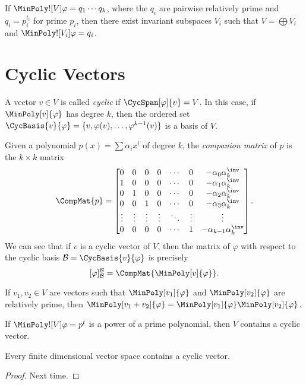\documentclass{memoir}
\begin{document}
\begin{cor}
If $\MinPoly![V]{\varphi} = q_1 \cdots q_k$, where the $q_i$ are pairwise relatively prime and $q_i = p_i^{t_i}$ for prime $p_i$, then there exist invariant subspaces $V_i$ such that $V = \bigoplus V_i$ and $\MinPoly![V_i]{\varphi} = q_i$.
\end{cor}

\section{Cyclic Vectors}

\begin{dfn}
A vector $v \in V$ is called \emph{cyclic} if $\CycSpan[\varphi]{v} = V$. In this case, if $\MinPoly[v]{\varphi}$ has degree $k$, then the ordered set $\CycBasis{v}{\varphi} = \{v,\varphi(v),\ldots,\varphi^{k-1}(v)\}$ is a basis of $V$.
\end{dfn}

Given a polynomial $p(x) = \sum \alpha_i x^i$ of degree $k$, the \emph{companion matrix} of $p$ is the $k \times k$ matrix \[ \CompMat{p} = \begin{bmatrix} 0 & 0 & 0 & 0 & \cdots & 0 & -\alpha_0\alpha_k^\inv \\ 1 & 0 & 0 & 0 & \cdots & 0 & -\alpha_1\alpha_k^\inv \\ 0 & 1 & 0 & 0 & \cdots & 0 & -\alpha_2\alpha_k^\inv \\ 0 & 0 & 1 & 0 & \cdots & 0 & -\alpha_3\alpha_k^\inv \\ \vdots & \vdots & \vdots & \vdots & \ddots & \vdots & \vdots \\ 0 & 0 & 0 & 0 & \cdots & 1 & -\alpha_{k-1}\alpha_k^\inv \end{bmatrix}. \] We can see that if $v$ is a cyclic vector of $V$, then the matrix of $\varphi$ with respect to the cyclic basis $\mathcal{B} = \CycBasis{v}{\varphi}$ is precisely \[ [\varphi]^\mathcal{B}_\mathcal{B} = \CompMat{\MinPoly[v]{\varphi}}. \]

\begin{prp} \mbox{}
\begin{enumerate*}
\item If $v_1, v_2 \in V$ are vectors such that $\MinPoly[v_1]{\varphi}$ and $\MinPoly[v_2]{\varphi}$ are relatively prime, then $\MinPoly[v_1+v_2]{\varphi} = \MinPoly[v_1]{\varphi} \MinPoly[v_2]{\varphi}$.
\item If $\MinPoly![V]{\varphi} = p^t$ is a power of a prime polynomial, then $V$ contains a cyclic vector.
\item Every finite dimensional vector space contains a cyclic vector.
\end{enumerate*}
\end{prp}

\begin{proof}
Next time.
\end{proof}
\end{document}
